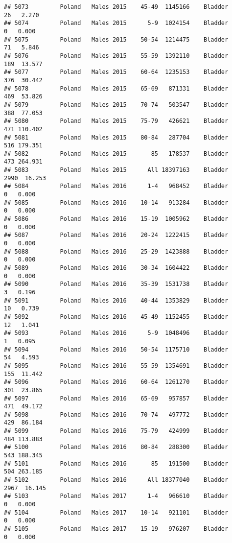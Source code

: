 \documentclass[
]{article}
\begin{document}
\begin{verbatim}
## 5073         Poland   Males 2015    45-49  1145166    Bladder     26   2.270
## 5074         Poland   Males 2015      5-9  1024154    Bladder      0   0.000
## 5075         Poland   Males 2015    50-54  1214475    Bladder     71   5.846
## 5076         Poland   Males 2015    55-59  1392110    Bladder    189  13.577
## 5077         Poland   Males 2015    60-64  1235153    Bladder    376  30.442
## 5078         Poland   Males 2015    65-69   871331    Bladder    469  53.826
## 5079         Poland   Males 2015    70-74   503547    Bladder    388  77.053
## 5080         Poland   Males 2015    75-79   426621    Bladder    471 110.402
## 5081         Poland   Males 2015    80-84   287704    Bladder    516 179.351
## 5082         Poland   Males 2015       85   178537    Bladder    473 264.931
## 5083         Poland   Males 2015      All 18397163    Bladder   2990  16.253
## 5084         Poland   Males 2016      1-4   968452    Bladder      0   0.000
## 5085         Poland   Males 2016    10-14   913284    Bladder      0   0.000
## 5086         Poland   Males 2016    15-19  1005962    Bladder      0   0.000
## 5087         Poland   Males 2016    20-24  1222415    Bladder      0   0.000
## 5088         Poland   Males 2016    25-29  1423888    Bladder      0   0.000
## 5089         Poland   Males 2016    30-34  1604422    Bladder      0   0.000
## 5090         Poland   Males 2016    35-39  1531738    Bladder      3   0.196
## 5091         Poland   Males 2016    40-44  1353829    Bladder     10   0.739
## 5092         Poland   Males 2016    45-49  1152455    Bladder     12   1.041
## 5093         Poland   Males 2016      5-9  1048496    Bladder      1   0.095
## 5094         Poland   Males 2016    50-54  1175710    Bladder     54   4.593
## 5095         Poland   Males 2016    55-59  1354691    Bladder    155  11.442
## 5096         Poland   Males 2016    60-64  1261270    Bladder    301  23.865
## 5097         Poland   Males 2016    65-69   957857    Bladder    471  49.172
## 5098         Poland   Males 2016    70-74   497772    Bladder    429  86.184
## 5099         Poland   Males 2016    75-79   424999    Bladder    484 113.883
## 5100         Poland   Males 2016    80-84   288300    Bladder    543 188.345
## 5101         Poland   Males 2016       85   191500    Bladder    504 263.185
## 5102         Poland   Males 2016      All 18377040    Bladder   2967  16.145
## 5103         Poland   Males 2017      1-4   966610    Bladder      0   0.000
## 5104         Poland   Males 2017    10-14   921101    Bladder      0   0.000
## 5105         Poland   Males 2017    15-19   976207    Bladder      0   0.000

\end{verbatim}
\end{document}
